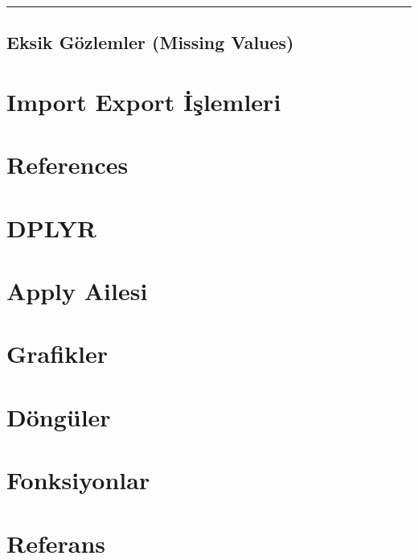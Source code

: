 \documentclass[
]{book}
\begin{document}
\begin{center}\rule{0.5\linewidth}{0.5pt}\end{center}

\hypertarget{eksik-guxf6zlemler-missing-values}{%
\section{Eksik Gözlemler (Missing Values)}\label{eksik-guxf6zlemler-missing-values}}

\hypertarget{import-export-iux15flemleri}{%
\chapter{Import Export İşlemleri}\label{import-export-iux15flemleri}}

\hypertarget{references}{%
\chapter{References}\label{references}}

\hypertarget{dplyr}{%
\chapter{DPLYR}\label{dplyr}}

\hypertarget{apply-ailesi}{%
\chapter{Apply Ailesi}\label{apply-ailesi}}

\hypertarget{grafikler}{%
\chapter{Grafikler}\label{grafikler}}

\hypertarget{duxf6nguxfcler}{%
\chapter{Döngüler}\label{duxf6nguxfcler}}

\hypertarget{fonksiyonlar}{%
\chapter{Fonksiyonlar}\label{fonksiyonlar}}

\hypertarget{referans}{%
\chapter{Referans}\label{referans}}

  
\end{document}
